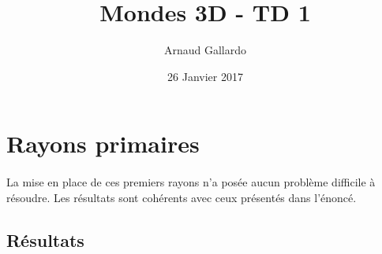 \documentclass{article}
\title{Mondes 3D - TD 1}
\author{Arnaud Gallardo}
\date{26 Janvier 2017}
\begin{document}
\maketitle

\section{Rayons primaires}
\paragraph*{}
La mise en place de ces premiers rayons n'a posée aucun problème difficile à
résoudre. Les résultats sont cohérents avec ceux présentés dans l'énoncé.

\subsection*{Résultats}
\end{document}

